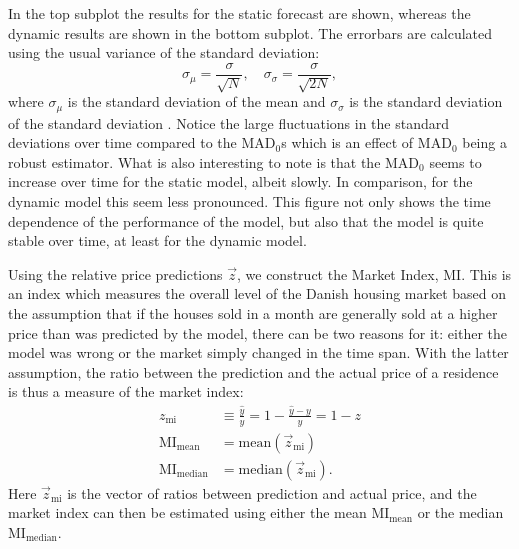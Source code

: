 In the top subplot the results for the static forecast are shown, whereas the dynamic results are shown in the bottom subplot. The errorbars are calculated using the usual variance of the standard deviation:
\begin{equation}
  \sigma_\mu  = \frac{\sigma}{\sqrt{N}}, \quad \sigma_\sigma = \frac{\sigma}{\sqrt{2N}},
\end{equation}
where $\sigma_\mu$ is the standard deviation of the mean and $\sigma_\sigma$ is the standard deviation of the standard deviation \autocite{Barlow:0471922951}.
Notice the large fluctuations in the standard deviations over time compared to the $\mathrm{MAD}_0$s which is an effect of $\mathrm{MAD}_0$ being a robust estimator. What is also interesting to note is that the $\mathrm{MAD}_0$ seems to increase over time for the static model, albeit slowly. In comparison, for the dynamic model this seem less pronounced. This figure not only shows the time dependence of the performance of the model, but also that the model is quite stable over time, at least for the dynamic model. 

Using the relative price predictions $\vec{z}$, we construct the Market Index, $\mathrm{MI}$. This is an index which measures the overall level of the Danish housing market based on the assumption that if the houses sold in a month are generally sold at a higher price than was predicted by the model, there can be two reasons for it: either the model was wrong or the market simply changed in the time span. With the latter assumption, the ratio between the prediction and the actual price of a residence is thus a measure of the market index:
\begin{equation}
  \begin{split}
    z_\mathrm{mi} &\equiv \frac{\hat{y}}{y} = 1 - \frac{\hat{y}-y}{y}  = 1-z \\
    \mathrm{MI}_\mathrm{mean} &= \mathrm{mean}(\vec{z}_\mathrm{mi}) \\
    \mathrm{MI}_\mathrm{median} &= \mathrm{median}(\vec{z}_\mathrm{mi}).
    \label{eq:h:market_index}
  \end{split}
\end{equation}
Here $\vec{z}_\mathrm{mi}$ is the vector of ratios between prediction and actual price, and the market index can then be estimated using either the mean $\mathrm{MI}_\mathrm{mean}$ or the median $\mathrm{MI}_\mathrm{median}$. 

